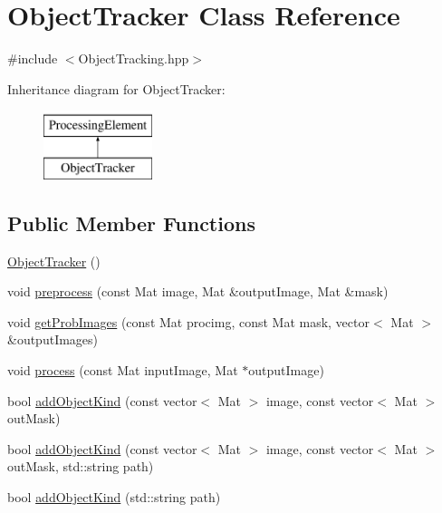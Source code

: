 \hypertarget{classObjectTracker}{\section{\-Object\-Tracker \-Class \-Reference}
\label{classObjectTracker}
}


{\ttfamily \#include $<$\-Object\-Tracking.\-hpp$>$}

\-Inheritance diagram for \-Object\-Tracker\-:\begin{figure}[H]
\begin{center}
\leavevmode
\includegraphics[height=2.000000cm]{classObjectTracker}
\end{center}
\end{figure}
\subsection*{\-Public \-Member \-Functions}
\begin{DoxyCompactItemize}
\item 
\hyperlink{classObjectTracker_adb4db35c2a82ae90cbdaa266cac5c775}{\-Object\-Tracker} ()
\item 
void \hyperlink{classObjectTracker_a04e2bea43c4747eb610d4f065e803c5f}{preprocess} (const \-Mat image, \-Mat \&output\-Image, \-Mat \&mask)
\item 
void \hyperlink{classObjectTracker_a903c174fa6001b0058f50b566e6ab636}{get\-Prob\-Images} (const \-Mat procimg, const \-Mat mask, vector$<$ \-Mat $>$ \&output\-Images)
\item 
void \hyperlink{classObjectTracker_a27d7191b74f76ddbce323f2f5efb6bae}{process} (const \-Mat input\-Image, \-Mat $\ast$output\-Image)
\item 
bool \hyperlink{classObjectTracker_afb6356a2e95b0dc1a939f561c2036ae4}{add\-Object\-Kind} (const vector$<$ \-Mat $>$ image, const vector$<$ \-Mat $>$ out\-Mask)
\item 
bool \hyperlink{classObjectTracker_a88b9cfc248aca05f1689ca66e407221a}{add\-Object\-Kind} (const vector$<$ \-Mat $>$ image, const vector$<$ \-Mat $>$ out\-Mask, std\-::string path)
\item 
bool \hyperlink{classObjectTracker_afbfd1340e949be28533bda106cf5a418}{add\-Object\-Kind} (std\-::string path)
\end{DoxyCompactItemize}
